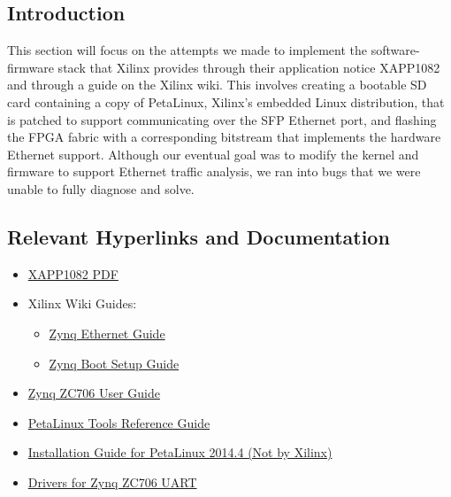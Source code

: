 \documentclass[12pt]{report}
\begin{document}
\subsection{Introduction}
This section will focus on the attempts we made to implement the software-firmware stack that Xilinx provides through their application notice XAPP1082 and through a guide on the Xilinx wiki. This involves creating a bootable SD card containing a copy of PetaLinux, Xilinx's embedded Linux distribution, that is patched to support communicating over the SFP Ethernet port, and flashing the FPGA fabric with a corresponding bitstream that implements the hardware Ethernet support. Although our eventual goal was to modify the kernel and firmware to support Ethernet traffic analysis, we ran into bugs that we were unable to fully diagnose and solve.
\subsection{Relevant Hyperlinks and Documentation}
\begin{itemize}
  \item \href{http://www.xilinx.com/support/documentation/application_notes/xapp1082-zynq-eth.pdf}{XAPP1082 PDF}
  \item Xilinx Wiki Guides:
    \begin{itemize}
    \item \href{http://www.wiki.xilinx.com/Zynq+PL+Ethernet}{Zynq Ethernet Guide}
    \item \href{http://www.wiki.xilinx.com/Prepare+Boot+Medium}{Zynq Boot Setup Guide}
    \end{itemize}
  \item \href{http://www.xilinx.com/support/documentation/boards_and_kits/zc706/ug954-zc706-eval-board-xc7z045-ap-soc.pdf}{Zynq ZC706 User Guide}
  \item \href{http://www.xilinx.com/support/documentation/sw_manuals/petalinux2014_4/ug1144-petalinux-tools-reference-guide.pdf}{PetaLinux Tools Reference Guide}
  \item \href{http://www.syfer.com.au/assets/s502-00000-a.pdf}{Installation Guide for PetaLinux 2014.4 (Not by Xilinx)}
  \item \href{http://www.silabs.com/products/mcu/Pages/USBtoUARTBridgeVCPDrivers.aspx}{Drivers for Zynq ZC706 UART}
\end{itemize}
\end{document}
